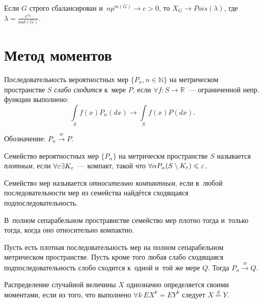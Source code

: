 \documentclass{article}
\begin{document}
\begin{theorem}
	Если $G$ строго сбалансирован и~$n p^{m(G)} \rightarrow c > 0$, то $X_G
	\rightarrow Pois(\lambda)$, где $\lambda = \frac{c^{v_G}}{aut(G)}$.
\end{theorem}

\section{Метод моментов}

\begin{definition}
	Последовательность вероятностных мер $\{P_n, n \in \mathbb{N}\}$ на
	метрическом пространстве $S$ \emph{слабо сходится} к~мере $P$, если
	$\forall f: S \rightarrow \mathbb{R}$~--- ограниченной непр. функции
	выполнено:
	$$ \int\limits_S f(x) P_n(dx) \rightarrow \int\limits_S f(x) P(dx).$$

	Обозначение: $P_n \overset{w}\rightarrow P$.
\end{definition}
\begin{definition}
	Семейство вероятностных мер $\{P_\alpha\}$ на метрическм пространстве $S$
	называется \emph{плотным}, если $\forall \varepsilon \exists K_\varepsilon$~--- компакт,
	такой что $\forall \alpha P_\alpha(S \setminus K_\varepsilon) \leqslant \varepsilon$.

	Семейство мер называется \emph{относительно компактным}, если в~любой
	последовательности мер из семейства найдётся сходящаяся подпоследовательность.
\end{definition}

\begin{theorem}[Прохоров]
	В~полном сепарабельном простравнстве семейство мер плотно тогда и~только
	тогда, когда оно относительно компактно.
\end{theorem}

\begin{corollary}
	Пусть есть плотная последовательность мер на полном сепарабельном метрическом
	пространстве. Пусть кроме того любая слабо сходящаяся подпоследовательность
	слобо сходится к~одной и~той же мере $Q$. Тогда $P_n \overset{w}\rightarrow
	Q$.
\end{corollary}

\begin{definition}
	Распределение случайной величины $X$ однозначно определяется своими моментами,
	если из того, что выполнено $\forall k\ EX^k = EY^k$ следует $X \overset{d}=
	Y$.
\end{definition}
\end{document}
